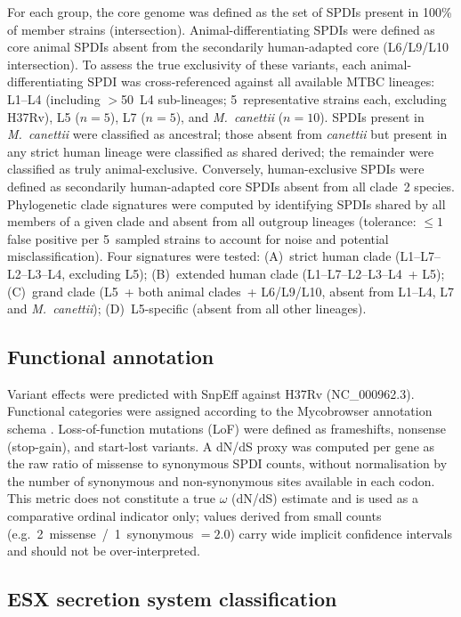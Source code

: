 \documentclass[11pt,a4paper]{article}
\begin{document}
For each group, the core genome was defined as the set of SPDIs present
in 100\% of member strains (intersection).
%
Animal-differentiating SPDIs were defined as core animal SPDIs absent from
the secondarily human-adapted core (L6/L9/L10 intersection).
%
To assess the true exclusivity of these variants, each animal-differentiating
SPDI was cross-referenced against all available MTBC lineages: L1--L4
(including $>$50~L4 sub-lineages; 5~representative strains each,
excluding H37Rv), L5 ($n = 5$), L7 ($n = 5$), and \textit{M.~canettii}
($n = 10$). SPDIs present in \textit{M.~canettii} were classified as
ancestral; those absent from \textit{canettii} but present in any strict
human lineage were classified as shared derived; the remainder were
classified as truly animal-exclusive.
%
Conversely, human-exclusive SPDIs were defined as secondarily human-adapted core SPDIs
absent from all clade~2 species.
%
Phylogenetic clade signatures were computed by identifying SPDIs shared
by all members of a given clade and absent from all outgroup lineages
(tolerance: $\leq 1$ false positive per 5~sampled strains to account
for noise and potential misclassification).
Four signatures were tested: (A)~strict human clade (L1--L7--L2--L3--L4,
excluding L5); (B)~extended human clade (L1--L7--L2--L3--L4~+ L5);
(C)~grand clade (L5~+ both animal clades~+ L6/L9/L10, absent from
L1--L4, L7 and \textit{M.~canettii});
(D)~L5-specific (absent from all other lineages).

\subsection{Functional annotation}
\label{sec:methods:annotation}

Variant effects were predicted with SnpEff \cite{Cingolani2012} against
H37Rv (NC\_000962.3).
%
Functional categories were assigned according to the Mycobrowser
annotation schema \cite{Kapopoulou2011}.
%
Loss-of-function mutations (LoF) were defined as frameshifts, nonsense
(stop-gain), and start-lost variants.
%
A dN/dS proxy was computed per gene as the raw ratio of missense to synonymous
SPDI counts, without normalisation by the number of synonymous and
non-synonymous sites available in each codon. This metric does not
constitute a true $\omega$ (dN/dS) estimate and is used as a comparative
ordinal indicator only; values derived from small counts
(e.g.\ 2~missense~/~1~synonymous $= 2.0$) carry wide implicit confidence
intervals and should not be over-interpreted.

\subsection{ESX secretion system classification}
\label{sec:methods:esx}
\end{document}
